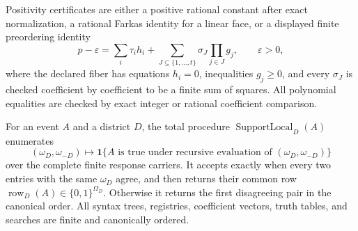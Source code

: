 Positivity certificates are either a positive rational constant after exact normalization, a rational Farkas identity for a linear face, or a displayed finite preordering identity
\[
p-\varepsilon=
\sum_i\tau_i h_i+
\sum_{J\subseteq\{1,\ldots,t\}}\sigma_J
\prod_{j\in J}g_j,
\qquad \varepsilon>0,
\]
where the declared fiber has equations \(h_i=0\), inequalities \(g_j\geq0\), and every \(\sigma_J\) is checked coefficient by coefficient to be a finite sum of squares.  All polynomial equalities are checked by exact integer or rational coefficient comparison.

For an event \(A\) and a district \(D\), the total procedure \(\operatorname{SupportLocal}_D(A)\) enumerates
\[
(\omega_D,\omega_{-D})\longmapsto
\mathbf 1\{A\text{ is true under recursive evaluation of }(\omega_D,\omega_{-D})\}
\]
over the complete finite response carriers.  It accepts exactly when every two entries with the same \(\omega_D\) agree, and then returns their common row \(\operatorname{row}_D(A)\in\{0,1\}^{\Omega_D}\).  Otherwise it returns the first disagreeing pair in the canonical order.  All syntax trees, registries, coefficient vectors, truth tables, and searches are finite and canonically ordered.